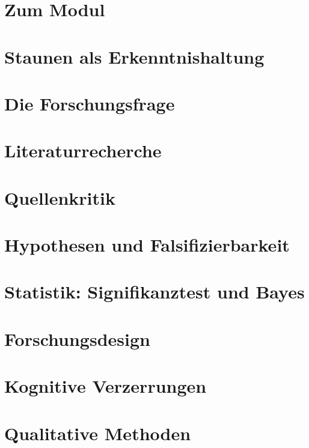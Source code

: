 \setcounter{chapter}{-1}
\chapter{Zum Modul}


\chapter{Staunen als Erkenntnishaltung}


\chapter{Die Forschungsfrage}


\chapter{Literaturrecherche}


\chapter{Quellenkritik}


\chapter{Hypothesen und Falsifizierbarkeit}


\chapter{Statistik: Signifikanztest und Bayes}


\chapter{Forschungsdesign}


\chapter{Kognitive Verzerrungen}


\chapter{Qualitative Methoden}


